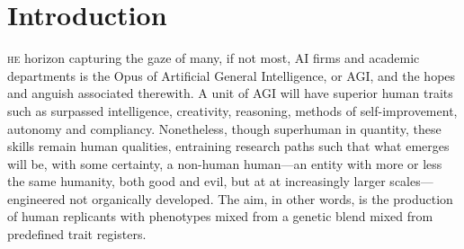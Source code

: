


\section*{Introduction}

\lettrine[lines=3]{\junicode{\textcolor{violet}{T}}}{he} horizon capturing the
gaze of many, if not most, AI firms and academic departments is the Opus of
Artificial General Intelligence, or \textsc{AGI}, and the hopes and anguish
associated therewith.  A unit of \textsc{AGI} will have superior human traits
such as surpassed intelligence, creativity, reasoning, methods of
self-improvement, autonomy and compliancy. Nonetheless, though superhuman in
quantity, these skills remain human qualities, entraining research paths such
that what emerges will be, with some certainty, a non-human human---an entity
with more or less the same humanity, both good and evil, but at at increasingly
larger scales---engineered not organically developed.  The aim, in other words,
is the production of human replicants with phenotypes mixed from a genetic
blend mixed from predefined trait registers.


